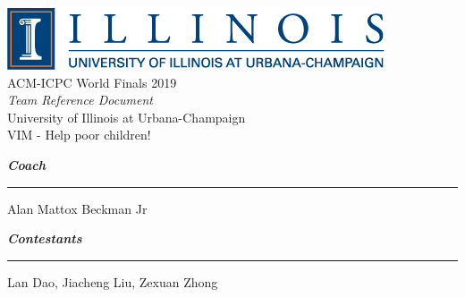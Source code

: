 \documentclass[10pt,landscape]{article}
\begin{document}
\begin{center}
    \includegraphics[scale=0.7]{logo.png} \\
    \vspace{15mm}
    {\Huge ACM-ICPC World Finals 2019} \\
    \vspace{10mm}
    {\LARGE \textit{Team Reference Document}} \\
    \vspace{10mm}
    {\LARGE University of Illinois at Urbana-Champaign} \\
    \vspace{5mm}
    {\LARGE VIM - Help poor children!} \\
    \vspace{30mm}
\end{center}

{\Large \textbf{\textit{Coach}}}
\vspace{5mm}
\hrule
\vspace{5mm}
{\Large Alan Mattox Beckman Jr} \\
\vspace{10mm}

{\Large \textbf{\textit{Contestants}}}
\vspace{5mm}
\hrule
\vspace{5mm}
{\Large Lan Dao, Jiacheng Liu, Zexuan Zhong}
\end{document}
